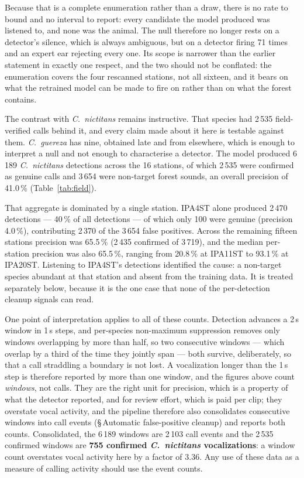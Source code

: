 \documentclass[review,3p,times]{elsarticle}
\begin{document}
Because that is a complete enumeration rather than a draw, there is no rate to
bound and no interval to report: every candidate the model produced was
listened to, and none was the animal. The null therefore no longer rests on a
detector's silence, which is always ambiguous, but on a detector firing 71 times
and an expert ear rejecting every one. Its scope is narrower than the earlier
statement in exactly one respect, and the two should not be conflated: the
enumeration covers the four rescanned stations, not all sixteen, and it bears on
what the retrained model can be made to fire on rather than on what the forest
contains.

The contrast with \textit{C.\ nictitans} remains instructive. That species had
2\,535 field-verified calls behind it, and every claim made about it here is
testable against them. \textit{C.\ guereza} has nine, obtained late and from
elsewhere, which is enough to interpret a null and not enough to characterise a
detector.
The model produced 6\,189 \textit{C.\ nictitans} detections across the 16
stations, of which 2\,535 were confirmed as genuine calls and 3\,654 were
non-target forest sounds, an overall precision of 41.0\,\%
(Table~\ref{tab:field}).

That aggregate is dominated by a single station. IPA4ST alone produced 2\,470
detections --- 40\,\% of all detections --- of which only 100 were genuine
(precision 4.0\,\%), contributing 2\,370 of the 3\,654 false positives. Across
the remaining fifteen stations precision was 65.5\,\% (2\,435 confirmed of
3\,719), and the median per-station precision was also 65.5\,\%, ranging from
20.8\,\% at IPA11ST to 93.1\,\% at IPA20ST. Listening to IPA4ST's detections
identified the cause: a non-target species abundant at that station and absent
from the training data. It is treated separately below, because it is the one
case that none of the per-detection cleanup signals can read.

One point of interpretation applies to all of these counts. Detection advances a
2\,s window in 1\,s steps, and per-species non-maximum suppression removes only
windows overlapping by more than half, so two consecutive windows --- which
overlap by a third of the time they jointly span --- both survive, deliberately,
so that a call straddling a boundary is not lost. A vocalization longer than the
1\,s step is therefore reported by more than one window, and the figures above
count \emph{windows}, not calls. They are the right unit for precision, which is
a property of what the detector reported, and for review effort, which is paid
per clip; they overstate vocal activity, and the pipeline therefore also
consolidates consecutive windows into call events
(\S\,Automatic false-positive cleanup) and reports both counts. Consolidated,
the 6\,189 windows are 2\,103 call events and the 2\,535 confirmed windows are
\textbf{755 confirmed \textit{C.\ nictitans} vocalizations}: a window count
overstates vocal activity here by a factor of 3.36. Any use of these data as a
measure of calling activity should use the event counts.
\end{document}
